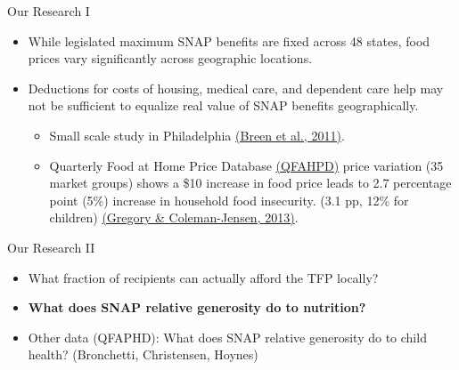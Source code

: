 \documentclass{beamer}
\begin{document}
\begin{frame}{Our Research I}
\begin{itemize}
\item
 While legislated maximum SNAP benefits are fixed across 48 states, food prices vary significantly across geographic locations.
\item Deductions for costs of housing, medical care, and dependent care help may not be sufficient to equalize real value of SNAP benefits geographically.
\begin{itemize}
\item Small scale study in Philadelphia \href{http://www.childrenshealthwatch.org/publication/real-cost-of-a-healthy-diet-2011/}{(Breen et al., 2011)}.
\item  Quarterly Food at Home Price Database \href{http://www.ers.usda.gov/data-products/quarterly-food-at-home-price-database.aspx}{(QFAHPD)} price variation (35 market groups) shows  a \$10 increase in food price leads to 2.7 percentage point (5\%) increase in household food insecurity. (3.1 pp, 12\% for children) \href{http://aepp.oxfordjournals.org/content/35/4/679}{(Gregory \& Coleman-Jensen, 2013)}.
\end{itemize}
\end{itemize}
\end{frame}

\begin{frame}{Our Research II}
\begin{itemize}
\item
 What fraction of recipients can actually afford the TFP locally?
\item 
\textbf{What does SNAP relative generosity do to nutrition?}
\vskip0.5in
\item Other data (QFAPHD): 
 What does SNAP relative generosity do to child health? (Bronchetti, Christensen, Hoynes)
\end{itemize}
\end{frame}

\end{document}
